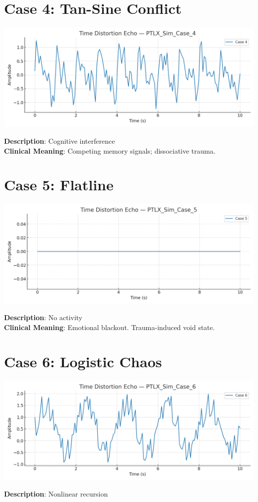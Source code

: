 \documentclass[12pt]{article}
\begin{document}
\section*{Case 4: Tan-Sine Conflict}
\begin{center}
\includegraphics[width=0.95\linewidth]{PTLX_Sim_Case_4.png}
\end{center}
\textbf{Description}: Cognitive interference \\

\textbf{Clinical Meaning}: Competing memory signals; dissociative trauma.

\newpage

\section*{Case 5: Flatline}
\begin{center}
\includegraphics[width=0.95\linewidth]{PTLX_Sim_Case_5.png}
\end{center}
\textbf{Description}: No activity \\

\textbf{Clinical Meaning}: Emotional blackout. Trauma-induced void state.

\newpage

\section*{Case 6: Logistic Chaos}
\begin{center}
\includegraphics[width=0.95\linewidth]{PTLX_Sim_Case_6.png}
\end{center}
\textbf{Description}: Nonlinear recursion \\
\end{document}
